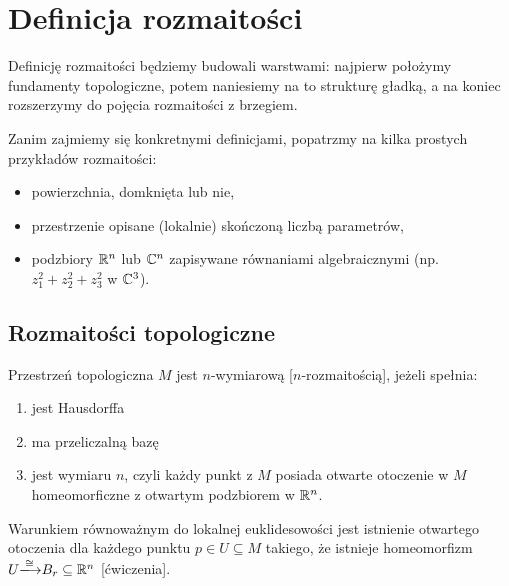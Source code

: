 \section{Definicja rozmaitości}

%
%
%
%
%

Definicję rozmaitości będziemy budowali warstwami: najpierw położymy fundamenty topologiczne, potem naniesiemy na to strukturę gładką, a na koniec rozszerzymy do pojęcia rozmaitości z brzegiem.

Zanim zajmiemy się konkretnymi definicjami, popatrzmy na kilka prostych przykładów rozmaitości:
\begin{itemize}
  \item powierzchnia, domknięta lub nie,
  \item przestrzenie opisane (lokalnie) skończoną liczbą parametrów,
  \item podzbiory $\mathbb{R}^n$ lub $\mathbb{C}^n$ zapisywane równaniami algebraicznymi (np. $z_1^2+z_2^2+z_3^2$ w $\mathbb{C}^3$).
\end{itemize}

\subsection{Rozmaitości topologiczne}

\begin{definition}
Przestrzeń topologiczna $M$ jest $n$-wymiarową  [$n$-rozmaitością], jeżeli spełnia:
\begin{enumerate}
    \item jest Hausdorffa
    \item ma przeliczalną bazę
    \item jest  wymiaru $n$, czyli każdy punkt z $M$ posiada otwarte otoczenie w $M$ homeomorficzne z otwartym podzbiorem w $\mathbb{R}^n$.
\end{enumerate}
\end{definition}

Warunkiem równoważnym do lokalnej euklidesowości jest istnienie otwartego otoczenia dla każdego punktu $p\in U\subseteq M$ takiego, że istnieje homeomorfizm $U\isomorphism B_r\subseteq\R^n$ [ćwiczenia].
\medskip

